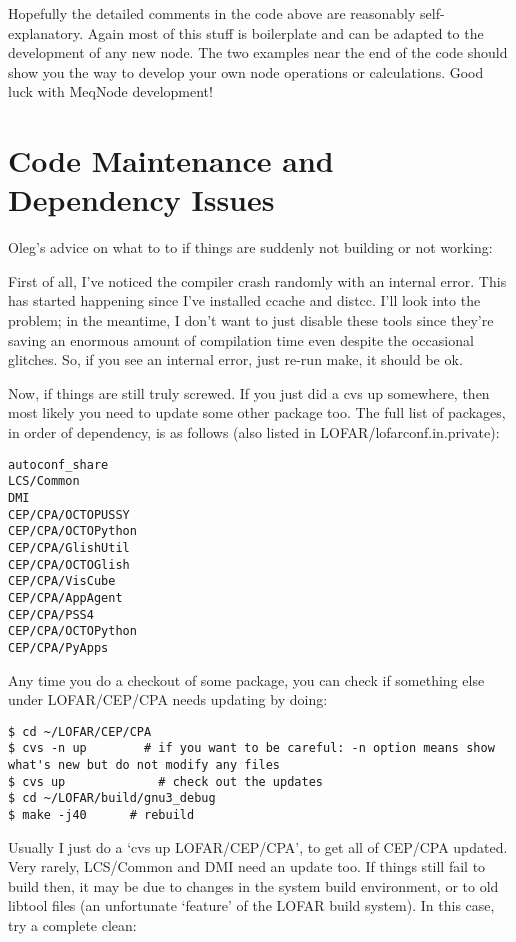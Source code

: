 \documentclass[10pt]{article}
\begin{document}
Hopefully the detailed comments in the code above are reasonably
self-explanatory. Again most of this stuff is boilerplate and
can be adapted to the development of any new node. The two examples
near the end of the code should show you the way to develop
your own node operations or calculations. Good luck with MeqNode development!

\section {Code Maintenance and Dependency Issues} 
 
Oleg's advice on what to to if things are suddenly not building 
or not working: 

First of all, I've noticed the compiler crash randomly with an internal 
error. This has started happening since I've installed ccache and 
distcc. I'll look into the problem; in the meantime, I don't want to 
just disable these tools since they're saving an enormous amount of 
compilation time even despite the occasional glitches. So, if you see an 
internal error, just re-run make, it should be ok.

Now, if things are still truly screwed. If you just did a cvs up 
somewhere, then most likely you need to update some other package too. 
The full list of packages, in order of dependency, is as follows (also 
listed in LOFAR/lofarconf.in.private):

\begin{verbatim}
autoconf_share
LCS/Common
DMI
CEP/CPA/OCTOPUSSY
CEP/CPA/OCTOPython
CEP/CPA/GlishUtil
CEP/CPA/OCTOGlish
CEP/CPA/VisCube
CEP/CPA/AppAgent
CEP/CPA/PSS4
CEP/CPA/OCTOPython
CEP/CPA/PyApps
\end{verbatim}

Any time you do a checkout of some package, you
can check if something else under LOFAR/CEP/CPA needs updating by doing:
                                                                                
\begin{verbatim}
$ cd ~/LOFAR/CEP/CPA
$ cvs -n up        # if you want to be careful: -n option means show
what's new but do not modify any files
$ cvs up             # check out the updates
$ cd ~/LOFAR/build/gnu3_debug
$ make -j40      # rebuild
\end{verbatim}

Usually I just do a `cvs up LOFAR/CEP/CPA', to get all of CEP/CPA updated.
Very rarely, LCS/Common and DMI need an update too. If things still fail to
build then, it may be due to changes in the system build environment, or to
old libtool files (an unfortunate `feature' of the LOFAR build system). In
this case, try a complete clean:
\end{document}
